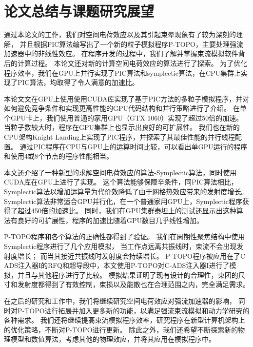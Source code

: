 
\chapter{论文总结与课题研究展望}
\label{chap:conclusion}
通过本论文的工作，我们对空间电荷效应以及其引起束晕现象有了较为深刻的理解，
并且根据PIC算法编写出了一个新的粒子模拟程序P-TOPO，主要处理强流加速器中的非线性效应。
在程序开发的过程中，我们了解并掌握束流模拟软件背后的计算过程。
本论文还对新的计算空间电荷效应的算法进行了探索。
为了优化程序效率，我们在GPU上并行实现了PIC算法和symplectic算法，在CPU集群上实现了PIC算法，均取得了令人满意的加速比。

本论文文在GPU上使用使用CUDA库实现了基于PIC方法的多粒子模拟程序，并对如何避免竞争条件和实现更高性能的GPU代码结构和并行策略进行了介绍。
在单个GPU卡上，我们使用普通的家用GPU（GTX 1060）实现了超过50倍的加速。
当粒子数较大时，程序在GPU集群上也显示出良好的可扩展性。
我们也在新的CPU架构Knight Landing上实现了PIC程序，并探索了其最佳性能的并行线程配置。
通过PIC程序在CPU与GPU上的运算时间比较，可以看出单GPU运行的程序和使用4或8个节点的程序性能相当。


本文还介绍了一种新型的求解空间电荷效应的算法-Symplectic算法，同时使用CUDA库在GPU上进行了实现。
这个算法能够保障辛条件，同PIC算法相比，Symplectic算法以增加运算量为代价效降低了由于网格热效应带来的发射度增长。
Symplectic算法非常适合GPU并行化，在一个普通家用GPU上，Symplectic程序获得了超过450倍的加速比。
同时，我们在GPU集群泰坦上的测试还显示出这种算法有良好的可扩展性，程序的加速比随着GPU数目几乎线性增加。

P-TOPO程序和各个算法的正确性都得到了验证。
我们在周期性聚焦结构中使用Symplectic程序进行了几个应用模拟，
当工作点远离共振线时，束流不会出现发射度增长；
而当其接近共振线时发射度会持续增长。
P-TOPO程序被应用在了C-ADS注入器I的RFQ和超导段中，本文使用P-TOPO对C-ADS注入器I进行了模拟，并且与其他程序进行了比较。
模拟结果证明了现有设计的合理性，束团的尺寸和发射度都得到了有效控制，束损以及能散也在合理范围之内，完全满足需求。

在之后的研究和工作中，我们将继续研究空间电荷效应对强流加速器的影响，
同时对P-TOPO进行拓展并加入更多新的功能，以满足强流束流模拟和动力学研究的各种需求。
我们还将继续提高束流模拟程序效率，研究程序在新型计算机架构上的优化策略，不断对P-TOPO进行更新。
除此之外，我们还希望不断探索新的物理模型和数值算法，考虑其他的物理效应，并将其应用在模拟程序中。